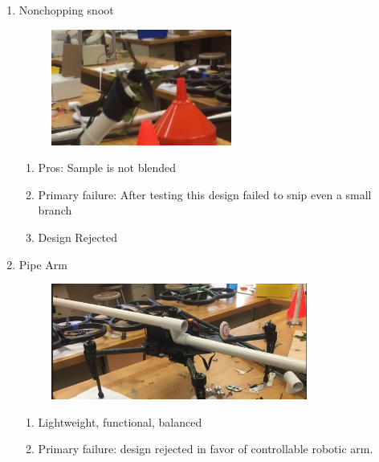 \begin{enumerate}
\item Nonchopping snoot
\begin{figure}
\begin{center}
\includegraphics[height=1.5in]{figures/robotarmmech6.png}
\end{center}
\end{figure}
\begin{enumerate}
\item Pros: Sample is not blended
\item Primary failure: After testing this design failed to snip even a small branch
\item Design Rejected
\end{enumerate}

\item Pipe Arm
\begin{figure}
\begin{center}
\includegraphics[height=1.5in]{figures/robotarmmech7.png}
\end{center}
\end{figure}
\begin{enumerate}
\item Lightweight, functional, balanced
\item Primary failure: design rejected in favor of controllable robotic arm. 
\end{enumerate}


\end{enumerate}
